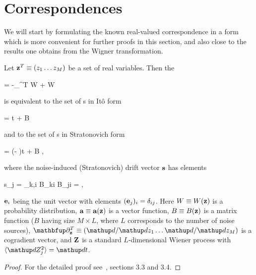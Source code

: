 \section{Correspondences}

We will start by formulating the known real-valued correspondence in a form which is more convenient for further proofs in this section, and also close to the results one obtains from the Wigner transformation.

\begin{lemma}
\label{lmm:fpe-sde:corr:fpe-sde-real}
	Let $\mathbf{z}^T \equiv (z_1 \ldots z_M)$ be a set of real variables.
	Then the 
	\begin{eqn*}
		= -\vcwd_{\zvec}^T \cdot \avec W
		+   W
	\end{eqn*}
	is equivalent to the set of s in It\^{o} form
	\begin{eqn*}
		\upd\zvec = \avec \upd t + B \upd\Zvec
	\end{eqn*}
	and to the set of s in Stratonovich form
	\begin{eqn*}
		\upd\zvec = (\avec - \svec)\upd t + B \upd\Zvec,
	\end{eqn*}
	where the noise-induced (Stratonovich) drift vector $\mathbf{s}$ has elements
	\begin{eqn*}
		s_j
		=  \sum_{k,i} B_{ki}  B_{ji}
		=  \Trace{B^T \vcwd_{\zvec} \evec_j^T B},
	\end{eqn*}
	$\mathbf{e}_i$ being the unit vector with elements $(\mathbf{e}_j)_i = \delta_{ij}$.
	Here $W \equiv W(\mathbf{z})$ is a probability distribution, $\mathbf{a} \equiv \mathbf{a}(\mathbf{z})$ is a vector function, $B \equiv B(\mathbf{z})$ is a matrix function ($B$ having size $M \times L$, where $L$ corresponds to the number of noise sources), $\vcwd_{\zvec}^T \equiv (\upd/\upd z_1 \ldots \upd/\upd z_M)$ is a cogradient vector, and $\mathbf{Z}$ is a standard $L$-dimensional Wiener process with $\langle \upd Z_j^2 \rangle = \upd t$.
\end{lemma}
\begin{proof}
For the detailed proof see~\cite{Risken1996}, sections 3.3 and 3.4.
\end{proof}

